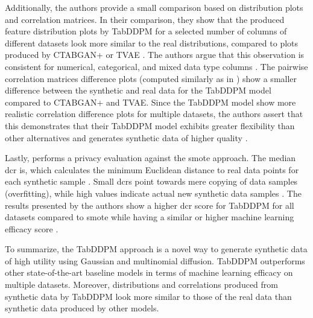 Additionally, the authors provide a small comparison based on distribution plots and correlation matrices.
In their comparison, they show that the produced feature distribution plots by TabDDPM for a selected number of columns of different datasets look more similar 
to the real distributions, compared to plots produced by CTABGAN+ or TVAE \cite{kotelnikov2022TabDDPMModellingTabular}.
The authors argue that this observation is consistent for numerical, categorical, and mixed data type columns \cite{kotelnikov2022TabDDPMModellingTabular}.
The pairwise correlation matrices difference plots (computed similarly as in \cite{brenninkmeijer2019GenerationEvaluationTabular}) show a smaller difference between the synthetic and real data for the TabDDPM \gls{model} compared to CTABGAN+ and TVAE.
Since the TabDDPM \gls{model} show more realistic correlation difference plots for multiple datasets, 
the authors assert that this demonstrates that their TabDDPM \gls{model} exhibits greater flexibility than other alternatives and generates synthetic data of higher quality \cite{kotelnikov2022TabDDPMModellingTabular}.

Lastly, \cite{kotelnikov2022TabDDPMModellingTabular} performs a privacy evaluation against the \gls{smote} approach.
The median \gls{dcr} is, which calculates the minimum Euclidean distance to real data points for each synthetic sample \cite{zhao2021CTABGANEffectiveTablea}.
Small \glspl{dcr} point towards mere copying of data samples (overfitting), while high values indicate actual new synthetic data samples \cite{kotelnikov2022TabDDPMModellingTabular}.
The results presented by the authors show a higher \gls{dcr} score for TabDDPM for all datasets compared to \gls{smote} while having a similar or higher machine learning efficacy score \cite{kotelnikov2022TabDDPMModellingTabular}.

To summarize, the TabDDPM approach is a novel way to generate synthetic data of high utility using Gaussian and multinomial diffusion.
TabDDPM outperforms other state-of-the-art baseline \glspl{model} in terms of machine learning efficacy on multiple datasets.
Moreover, distributions and correlations produced from synthetic data by TabDDPM look more similar to those of the real data than synthetic data produced by other \glspl{model}.





